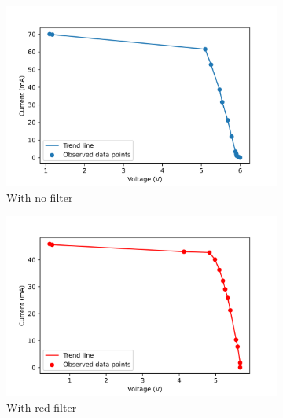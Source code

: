 \documentclass[%
 aip,
 amsmath,amssymb,
 reprint, floatfix%
]{revtex4-2}
\begin{document}
    \begin{figure}
        \centering
        \begin{subfigure}[b]{0.49\textwidth}
            \centering
            \includegraphics[scale = 0.54]{Figures/plot-iv-sun-nofilter.png}
            \caption{With no filter}
            \label{fig:iv-sun-nofilter}
        \end{subfigure}
        \hfill
        \begin{subfigure}[b]{0.49\textwidth}
            \centering
            \includegraphics[scale = 0.54]{Figures/plot-iv-sun-red.png}
            \caption{With red filter}
            \label{fig:iv-sun-red}
        \end{subfigure}
        \hfill
        \begin{subfigure}[b]{0.49\textwidth}
            \centering

\end{subfigure}
\end{figure}
\end{document}
